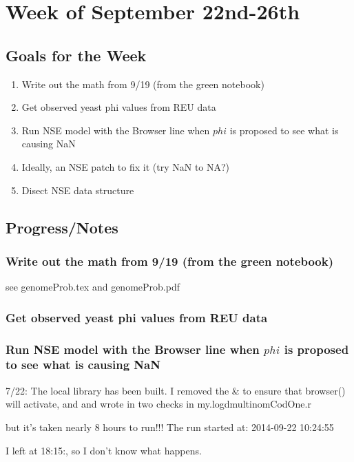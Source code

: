 \section{Week of September 22nd-26th}
\subsection{Goals for the Week}
\begin{enumerate}
\item Write out the math from 9/19 (from the green notebook)
\item Get observed yeast phi values from REU data
\item Run NSE model with the Browser line when $phi$ is proposed to see what is causing NaN
\item Ideally, an NSE patch to fix it (try NaN to NA?)
\item Disect NSE data structure
\end{enumerate}

\subsection{Progress/Notes}

\subsubsection{Write out the math from 9/19 (from the green notebook)}

see genomeProb.tex and genomeProb.pdf

\subsubsection{Get observed yeast phi values from REU data}

\subsubsection{Run NSE model with the Browser line when $phi$ is proposed to see what is causing NaN}

7/22: The local library has been built. I removed the \& to ensure that browser() will activate, and and wrote in two checks in my.logdmultinomCodOne.r



but it's taken nearly 8 hours to run!!! The run started at: 2014-09-22 10:24:55 

I left at 18:15:, so I don't know what happens.

